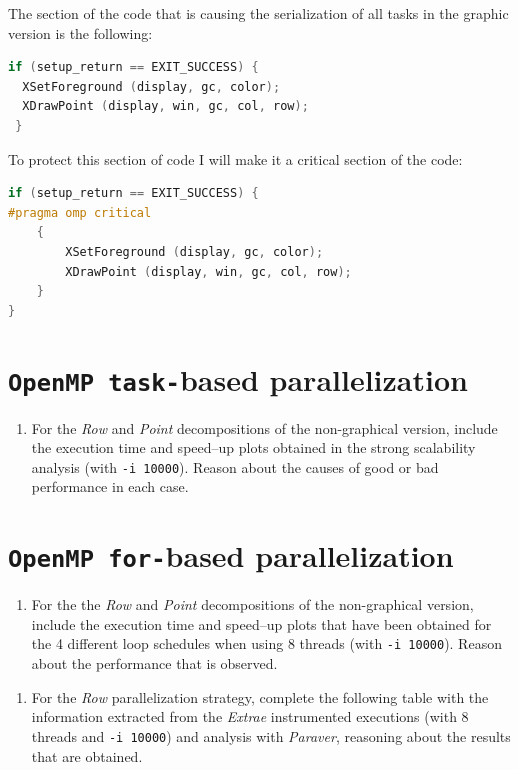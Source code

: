 \documentclass[a4paper]{article}
\begin{document}
The section of the code that is causing the serialization of all tasks in the graphic version is the following:

\begin{lstlisting}[language=C]
 if (setup_return == EXIT_SUCCESS) {
  XSetForeground (display, gc, color);
  XDrawPoint (display, win, gc, col, row);
 }           
\end{lstlisting}

To protect this section of code I will make it a critical section of the code:

\begin{lstlisting}[language=C]
if (setup_return == EXIT_SUCCESS) {
#pragma omp critical
	{
		XSetForeground (display, gc, color);
		XDrawPoint (display, win, gc, col, row);
	}
}           
\end{lstlisting}

\section{\texttt{OpenMP task-}based parallelization}

\begin{enumerate}
	\item For the \textit{Row} and \textit{Point} decompositions of the non-graphical version, include the execution time and speed–up plots obtained in the strong scalability analysis (with \texttt{-i 10000}). Reason about the causes of good or bad performance in each case.
\end{enumerate}

\section{\texttt{OpenMP for-}based parallelization}

\begin{enumerate}
	\item For the the \textit{Row} and \textit{Point} decompositions of the non-graphical version, include the execution time and speed–up plots that have been obtained for the 4 different loop schedules when using 8 threads (with \texttt{-i 10000}). Reason about the performance that is observed.
\end{enumerate}

\begin{enumerate}[resume]
	\item For the \textit{Row} parallelization strategy, complete the following table with the information extracted from the \textit{Extrae} instrumented executions (with 8 threads and \texttt{-i 10000}) and analysis with \textit{Paraver}, reasoning about the results that are obtained.
\end{enumerate}
\end{document}
